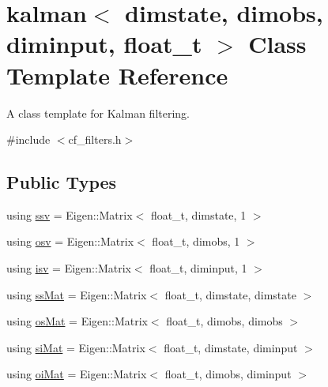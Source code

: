 \hypertarget{classkalman}{}\section{kalman$<$ dimstate, dimobs, diminput, float\+\_\+t $>$ Class Template Reference}
\label{classkalman}


A class template for Kalman filtering.  




{\ttfamily \#include $<$cf\+\_\+filters.\+h$>$}

\subsection*{Public Types}
\begin{DoxyCompactItemize}
\item 
using \hyperlink{classkalman_a732cf05b5ddd106cfdafc324d03f756e}{ssv} = Eigen\+::\+Matrix$<$ float\+\_\+t, dimstate, 1 $>$
\item 
using \hyperlink{classkalman_a0172e54797a5d5b0acc4168894adc6d5}{osv} = Eigen\+::\+Matrix$<$ float\+\_\+t, dimobs, 1 $>$
\item 
using \hyperlink{classkalman_abc570ce1b06e8a96a334f9226dfbce77}{isv} = Eigen\+::\+Matrix$<$ float\+\_\+t, diminput, 1 $>$
\item 
using \hyperlink{classkalman_a581550d9aba33245fb496b22a834831c}{ss\+Mat} = Eigen\+::\+Matrix$<$ float\+\_\+t, dimstate, dimstate $>$
\item 
using \hyperlink{classkalman_a28ffd71604fac7b25492b1b43379e046}{os\+Mat} = Eigen\+::\+Matrix$<$ float\+\_\+t, dimobs, dimobs $>$
\item 
using \hyperlink{classkalman_ab024c795f585385ee14aea92a5dccfbc}{si\+Mat} = Eigen\+::\+Matrix$<$ float\+\_\+t, dimstate, diminput $>$
\item 
using \hyperlink{classkalman_a35298f18f0b699f700e2d55d94bf54fc}{oi\+Mat} = Eigen\+::\+Matrix$<$ float\+\_\+t, dimobs, diminput $>$
\end{DoxyCompactItemize}
